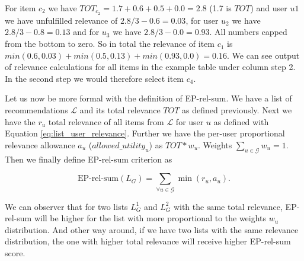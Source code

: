 For item $c_2$ we have $TOT_{c_2} = 1.7 + 0.6 + 0.5 + 0.0 = 2.8$ (1.7 is $TOT$) and user $u1$ we have unfulfilled relevance of $2.8 / 3 - 0.6 = 0.03$, for user $u_2$ we have $2.8 / 3 - 0.8 = 0.13$ and for $u_3$ we have $2.8 / 3 - 0.0 = 0.93$. All numbers capped from the bottom to zero. So in total the relevance of item $c_1$ is $min(0.6, 0.03) + min(0.5, 0.13) + min(0.93, 0.0) = 0.16$. We can see output of relevance calculations for all items in the example table under column step 2. In the second step we would therefore select item $c_4$.

Let us now be more formal with the definition of EP-rel-sum. We have a list of recommendations $\mathcal{L}$ and its total relevance $TOT$ as defined previously. Next we have the $r_u$ total relevance of all items from $\mathcal{L}$ for user $u$ as defined with Equation \ref{eq:list_user_relevance}. Further we have the per-user proportional relevance allowance $a_u$ ($\mathit{allowed\_utility_u}$)  as $TOT * w_u$. Weights $\sum_{u \in \mathcal{G}} w_u = 1$. 
Then we finally define EP-rel-sum criterion as

\begin{equation}
    \textrm{EP-rel-sum}(L_G) = \sum_{\forall u \in \mathcal{G}} \min(r_u, a_u).
\end{equation}

We can observer that for two lists $L_G^1$ and $L_G^2$ with the same total relevance, EP-rel-sum will be higher for the list with more proportional to the weights $w_u$ distribution. And other way around, if we have two lists with the same relevance distribution, the one with higher total relevance will receive higher EP-rel-sum score.

